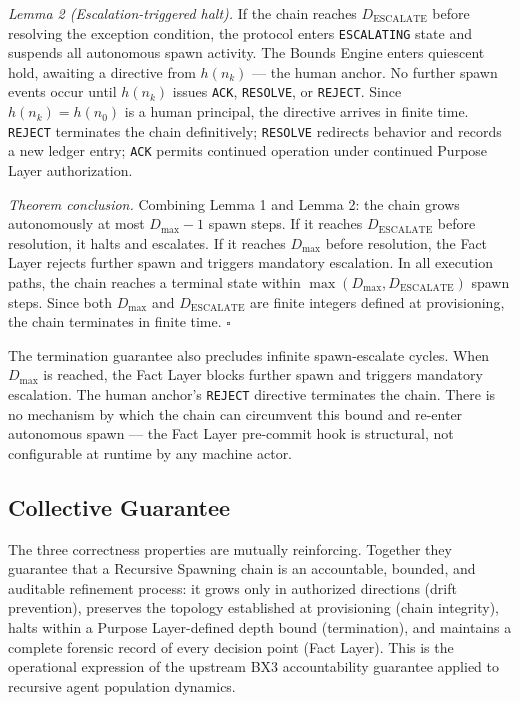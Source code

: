\medskip
\textit{Lemma 2 (Escalation-triggered halt).} If the chain reaches $D_{\mathrm{ESCALATE}}$ before resolving the exception condition, the protocol enters \texttt{ESCALATING} state and suspends all autonomous spawn activity. The Bounds Engine enters quiescent hold, awaiting a directive from $h(n_k)$ --- the human anchor. No further spawn events occur until $h(n_k)$ issues \texttt{ACK}, \texttt{RESOLVE}, or \texttt{REJECT}. Since $h(n_k) = h(n_0)$ is a human principal, the directive arrives in finite time. \texttt{REJECT} terminates the chain definitively; \texttt{RESOLVE} redirects behavior and records a new ledger entry; \texttt{ACK} permits continued operation under continued Purpose Layer authorization.

\medskip
\textit{Theorem conclusion.} Combining Lemma 1 and Lemma 2: the chain grows autonomously at most $D_{\mathrm{max}} - 1$ spawn steps. If it reaches $D_{\mathrm{ESCALATE}}$ before resolution, it halts and escalates. If it reaches $D_{\mathrm{max}}$ before resolution, the Fact Layer rejects further spawn and triggers mandatory escalation. In all execution paths, the chain reaches a terminal state within $\max(D_{\mathrm{max}}, D_{\mathrm{ESCALATE}})$ spawn steps. Since both $D_{\mathrm{max}}$ and $D_{\mathrm{ESCALATE}}$ are finite integers defined at provisioning, the chain terminates in finite time. $\square$

The termination guarantee also precludes infinite spawn-escalate cycles. When $D_{\mathrm{max}}$ is reached, the Fact Layer blocks further spawn and triggers mandatory escalation. The human anchor's \texttt{REJECT} directive terminates the chain. There is no mechanism by which the chain can circumvent this bound and re-enter autonomous spawn --- the Fact Layer pre-commit hook is structural, not configurable at runtime by any machine actor.

\subsection{Collective Guarantee}
\label{sec:rs-collective-guarantee}

The three correctness properties are mutually reinforcing. Together they guarantee that a Recursive Spawning chain is an accountable, bounded, and auditable refinement process: it grows only in authorized directions (drift prevention), preserves the topology established at provisioning (chain integrity), halts within a Purpose Layer-defined depth bound (termination), and maintains a complete forensic record of every decision point (Fact Layer). This is the operational expression of the upstream BX3 accountability guarantee applied to recursive agent population dynamics.

